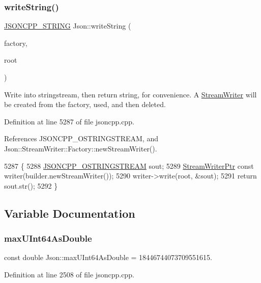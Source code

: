 \subsubsection{\texorpdfstring{write\+String()}{writeString()}}
{\footnotesize\ttfamily \hyperlink{json_8h_a1e723f95759de062585bc4a8fd3fa4be}{J\+S\+O\+N\+C\+P\+P\+\_\+\+S\+T\+R\+I\+NG} Json\+::write\+String (\begin{DoxyParamCaption}\item[{\hyperlink{class_json_1_1_stream_writer_1_1_factory}{Stream\+Writer\+::\+Factory} const \&}]{factory,  }\item[{\hyperlink{class_json_1_1_value}{Value} const \&}]{root }\end{DoxyParamCaption})}



Write into stringstream, then return string, for convenience. A \hyperlink{class_json_1_1_stream_writer}{Stream\+Writer} will be created from the factory, used, and then deleted. 



Definition at line 5287 of file jsoncpp.\+cpp.



References J\+S\+O\+N\+C\+P\+P\+\_\+\+O\+S\+T\+R\+I\+N\+G\+S\+T\+R\+E\+AM, and Json\+::\+Stream\+Writer\+::\+Factory\+::new\+Stream\+Writer().


\begin{DoxyCode}
5287                                                                                   \{
5288   \hyperlink{json_8h_a1d06ac2ca63c8c521f41231dfda0e6b3}{JSONCPP\_OSTRINGSTREAM} sout;
5289   \hyperlink{namespace_json_a7132404aeebfc96d7c6ad2c66260afb5}{StreamWriterPtr} \textcolor{keyword}{const} writer(builder.newStreamWriter());
5290   writer->write(root, &sout);
5291   \textcolor{keywordflow}{return} sout.str();
5292 \}
\end{DoxyCode}


\subsection{Variable Documentation}
\mbox{\label{namespace_json_aecc0306aa526f25c5156f842182fb7fb}} 
\subsubsection{\texorpdfstring{max\+U\+Int64\+As\+Double}{maxUInt64AsDouble}}
{\footnotesize\ttfamily const double Json\+::max\+U\+Int64\+As\+Double = 18446744073709551615.\hspace{0.3cm}{\ttfamily [static]}}



Definition at line 2508 of file jsoncpp.\+cpp.

